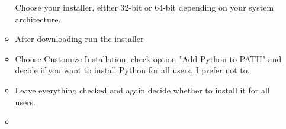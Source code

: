 \documentclass[a4paper,12pt]{article}
\begin{document}
\begin{enumerate}
\begin{itemize}
\begin{minipage}[t]{\linewidth}
{			}		
			\medskip	
		\end{minipage}
		Choose your installer, either 32-bit or 64-bit depending on your system architecture.
		\item After downloading run the installer
		\item \begin{minipage}[t]{\linewidth}
			\raggedright
			\medskip	
		\end{minipage}
		Choose Customize Installation, check option "Add Python to PATH" and decide if you want to install Python for all users, I prefer not to.
		\item \begin{minipage}[t]{\linewidth}
			\raggedright
			\medskip	
		\end{minipage}
		Leave everything checked and again decide whether to install it for all users.
		\item \begin{minipage}[t]{\linewidth}
			\raggedright
\end{minipage}
\end{itemize}
\end{enumerate}
\end{document}
